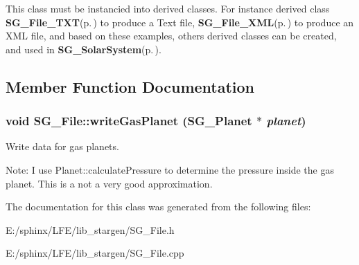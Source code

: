 This class must be instancied into derived classes. For instance derived class {\bf SG\_\-File\_\-TXT}{\rm (p.\,\pageref{class_s_g___file___t_x_t})} to produce a Text file, {\bf SG\_\-File\_\-XML}{\rm (p.\,\pageref{class_s_g___file___x_m_l})} to produce an XML file, and based on these examples, others derived classes can be created, and used in {\bf SG\_\-Solar\-System}{\rm (p.\,\pageref{class_s_g___solar_system})}. 



\subsection{Member Function Documentation}
\subsubsection{\setlength{\rightskip}{0pt plus 5cm}void SG\_\-File::write\-Gas\-Planet ({\bf SG\_\-Planet} $\ast$ {\em planet})\hspace{0.3cm}{\tt  [protected]}}\label{class_s_g___file_b3}


Write data for gas planets. 

Note: I use Planet::calculate\-Pressure to determine the pressure inside the gas planet. This is a not a very good approximation. 

The documentation for this class was generated from the following files:\begin{CompactItemize}
\item 
E:/sphinx/LFE/lib\_\-stargen/SG\_\-File.h\item 
E:/sphinx/LFE/lib\_\-stargen/SG\_\-File.cpp\end{CompactItemize}
